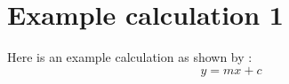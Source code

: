 \section{Example calculation 1}
\label{app:calc-1}

Here is an example calculation as shown by \cite{Elliott2016}: \\

\begin{equation}
y = mx + c
\label{eq:cost}
\end{equation} \\